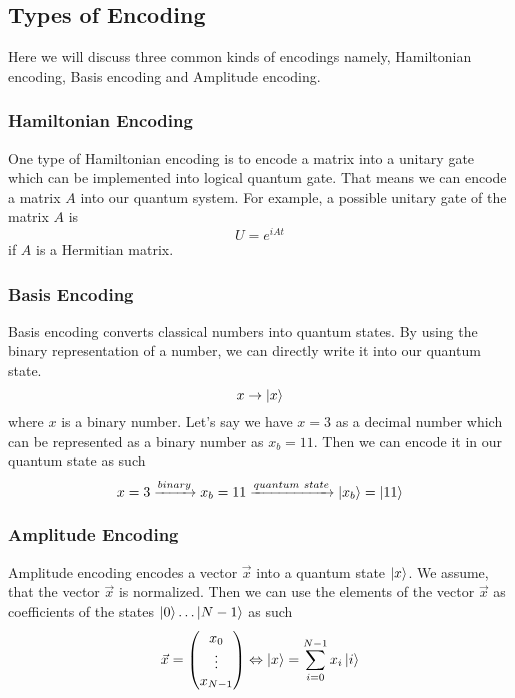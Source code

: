 \subsection{Types of Encoding}
Here we will discuss three common kinds of encodings namely, Hamiltonian encoding, Basis encoding and Amplitude encoding.

\subsubsection{Hamiltonian Encoding}
One type of Hamiltonian encoding is to encode a matrix into a unitary gate which can be implemented into logical quantum gate. 
That means we can encode a matrix $A$ into our quantum system.
For example, a possible unitary gate of the matrix $A$ is
\begin{equation}
    U = e^{iAt}
\end{equation}
if $A$ is a Hermitian matrix.

\subsubsection{Basis Encoding}
Basis encoding converts classical numbers into quantum states.
By using the binary representation of a number, we can directly write it into our quantum state. 
\begin{equation}
    x \rightarrow \ket {x}
\end{equation}
where $x$ is a binary number.
Let's say we have $x=3$ as a decimal number which can be represented as a binary number as $x_b = 11$.
Then we can encode it in our quantum state as such
\begin{equation}
    x=3 \xrightarrow[]{binary} x_b = 11 \xrightarrow[]{quantum\  state} \ket{x_b} = \ket{11}
\end{equation}

\subsubsection{Amplitude Encoding}
Amplitude encoding encodes a vector $\vec x$ into a quantum state $\ket x$. 
We assume, that the vector $\vec x$ is normalized. 
Then we can use the elements of the vector $\vec x$ as coefficients of the states $\ket 0 \dots \ket {N-1}$ as such
\begin{equation}
    \vec{x} = \begin{pmatrix} x_0\\ \vdots \\ x_{N-1} \end{pmatrix} 
    \Leftrightarrow  
     \ket x = \sum_{i=0}^{N-1} x_i \ket i
\end{equation}

